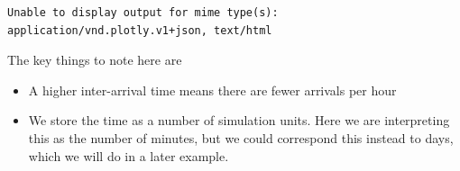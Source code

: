 \documentclass[
  letterpaper,
  DIV=11,
  numbers=noendperiod]{scrreprt}
\providecommand{\tightlist}{%
  \setlength{\itemsep}{0pt}\setlength{\parskip}{0pt}}\usepackage{longtable,booktabs,array}
\begin{document}
\begin{verbatim}
Unable to display output for mime type(s): application/vnd.plotly.v1+json, text/html
\end{verbatim}

\begin{tcolorbox}[enhanced jigsaw, rightrule=.15mm, colback=white, colframe=quarto-callout-tip-color-frame, colbacktitle=quarto-callout-tip-color!10!white, toprule=.15mm, coltitle=black, opacityback=0, titlerule=0mm, bottomtitle=1mm, breakable, title=\textcolor{quarto-callout-tip-color}{\faLightbulb}\hspace{0.5em}{Tip}, opacitybacktitle=0.6, toptitle=1mm, arc=.35mm, bottomrule=.15mm, leftrule=.75mm, left=2mm]

The key things to note here are

\begin{itemize}
\tightlist
\item
  A higher inter-arrival time means there are fewer arrivals per hour
\item
  We store the time as a number of simulation units. Here we are
  interpreting this as the number of minutes, but we could correspond
  this instead to days, which we will do in a later example.
\end{itemize}

\end{tcolorbox}
\end{document}
